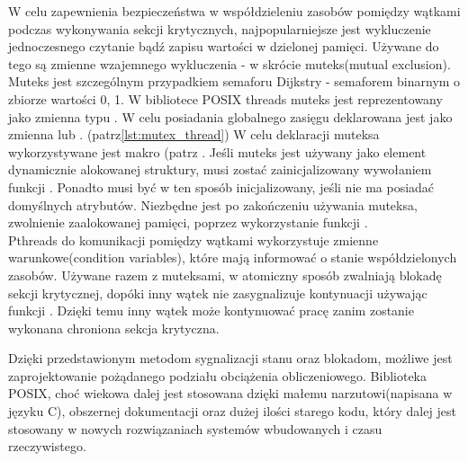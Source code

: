 \documentclass[document.tex]{subfiles}
\begin{document}
\indent W celu zapewnienia bezpieczeństwa w współdzieleniu zasobów
pomiędzy wątkami podczas wykonywania sekcji krytycznych,
najpopularniejsze jest wykluczenie jednoczesnego czytanie bądź zapisu
wartości w dzielonej pamięci. Używane do tego są zmienne wzajemnego
wykluczenia - w skrócie muteks(mutual exclusion). Muteks jest szczególnym przypadkiem semaforu Dijkstry - semaforem binarnym 
o zbiorze wartości {0, 1}.\cite{POSIX_Butenhof}\cite{POSIX_tutorial}\cite{POSIX_article} 
W bibliotece POSIX threads muteks jest reprezentowany jako zmienna typu . W celu posiadania globalnego
zasięgu deklarowana jest jako zmienna  lub .
\cite{POSIX_Butenhof}\cite{C_King}(patrz\ref{lst:mutex_thread})
W celu deklaracji muteksa wykorzystywane jest makro (patrz . Jeśli muteks jest używany jako
element dynamicznie alokowanej struktury, musi zostać zainicjalizowany 
wywołaniem funkcji . Ponadto musi być w ten
sposób inicjalizowany, jeśli nie ma posiadać domyślnych atrybutów.
Niezbędne jest po zakończeniu używania muteksa, zwolnienie zaalokowanej pamięci, poprzez wykorzystanie funkcji .\cite{POSIX_Butenhof} 
\\


\indent Pthreads do komunikacji pomiędzy wątkami wykorzystuje zmienne
warunkowe(condition variables), które mają informować o stanie 
współdzielonych zasobów. Używane razem z muteksami, w atomiczny 
sposób zwalniają blokadę sekcji krytycznej, dopóki inny wątek nie
zasygnalizuje kontynuacji używając funkcji . Dzięki temu inny wątek może kontynuować pracę 
zanim zostanie wykonana chroniona sekcja krytyczna.

\indent Dzięki przedstawionym metodom sygnalizacji stanu oraz 
blokadom, możliwe jest zaprojektowanie pożądanego podziału obciążenia
obliczeniowego. Biblioteka POSIX, choć wiekowa dalej jest stosowana
dzięki małemu narzutowi(napisana w języku C), obszernej dokumentacji 
oraz dużej ilości starego kodu, który dalej jest stosowany w nowych
rozwiązaniach systemów wbudowanych i czasu rzeczywistego.\cite{POSIX_tutorial}

\end{document}
